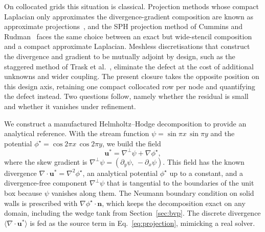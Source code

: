 \documentclass[preprint,review,12pt]{elsarticle}
\begin{document}
On collocated grids this situation is classical.
Projection methods whose compact Laplacian only approximates the divergence-gradient composition are known as approximate projections~\cite{Almgren1996,Almgren2000}, and the SPH projection method of Cummins and Rudman~\cite{Cummins1999} faces the same choice between an exact but wide-stencil composition and a compact approximate Laplacian.
Meshless discretisations that construct the divergence and gradient to be mutually adjoint by design, such as the staggered method of Trask et al.~\cite{Trask2017}, eliminate the defect at the cost of additional unknowns and wider coupling.
The present closure takes the opposite position on this design axis, retaining one compact collocated row per node and quantifying the defect instead.
Two questions follow, namely whether the residual is small and whether it vanishes under refinement.

We construct a manufactured Helmholtz--Hodge decomposition to provide an analytical reference.
With the stream function $\psi=\sin\pi x\,\sin\pi y$ and the potential $\phi^\star=\cos2\pi x\,\cos2\pi y$, we build the field
\begin{equation}
  \mathbf u^\ast=\nabla^\perp\!\psi+\nabla\phi^\star,
  \label{eq:hodgefield}
\end{equation}
where the skew gradient is $\nabla^\perp\!\psi=(\partial_y\psi,\,-\partial_x\psi)$.
This field has the known divergence $\nabla\!\cdot\mathbf u^\ast=\nabla^2\phi^\star$, an analytical potential $\phi^\star$ up to a constant, and a divergence-free component $\nabla^\perp\!\psi$ that is tangential to the boundaries of the unit box because $\psi$ vanishes along them.
The Neumann boundary condition on solid walls is prescribed with $\nabla\phi^\star\!\cdot\mathbf n$, which keeps the decomposition exact on any domain, including the wedge tank from Section~\ref{sec:bvp}.
The discrete divergence $\langle\nabla\!\cdot\mathbf u^\ast\rangle$ is fed as the source term in Eq.~\eqref{eq:projection}, mimicking a real solver.
\end{document}
